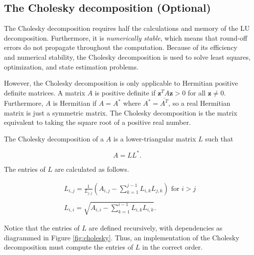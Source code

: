 \subsection*{The Cholesky decomposition (Optional)}
The Cholesky decomposition requires half the calculations and memory of the LU decomposition. 
Furthermore, it is \emph{numerically stable}, which means that round-off errors do not propagate throughout the computation. 
Because of its efficiency and numerical stability, the Cholesky decomposition is used to solve least squares, optimization, and state estimation problems.

However, the Cholesky decomposition is only applicable to Hermitian positive definite matrices. 
A matrix $A$ is positive definite if  $\mathbf{z}^TA\mathbf{z} > 0$ for all $\mathbf{z} \neq 0$. 
Furthermore, $A$ is Hermitian if $A = A^*$ where $A^* = \overline{A^T}$, so a real Hermitian matrix is just a symmetric matrix. 
The Cholesky decomposition is the matrix equivalent to taking the square root of a positive real number.

The Cholesky decomposition of a $A$ is a lower-triangular matrix $L$ such that

\begin{equation*}
 A = LL^*.
\end{equation*}

The entries of $L$ are calculated as follows.

\begin{align*}
&L_{i,j} = \frac{1}{L_{j,j}}\left(A_{i,j} -\sum_{k=1}^{j-1}{L_{i,k}L_{j,k}}\right) \mbox{ for $i>j$} \\ \\
&L_{i,i} = \sqrt{A_{i,i} - \sum_{k=1}^{i-1}{L_{i,k}L_{i,k}}}.
\end{align*}

Notice that the entries of $L$ are defined recursively, with dependencies as diagrammed in Figure \ref{fig:cholesky}. 
Thus, an implementation of the Cholesky decomposition must compute the entries of $L$ in the correct order.

